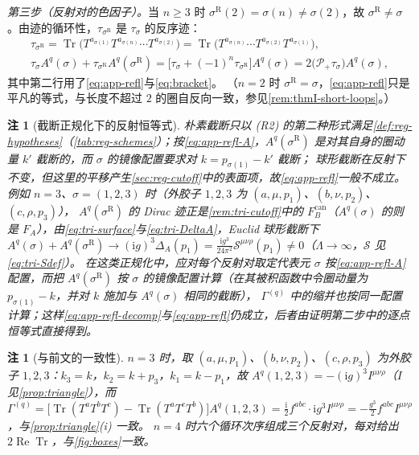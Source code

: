 \documentclass[UTF8,a4paper,11pt,fontset=fandol]{ctexart}
\makeatletter
\theoremstyle{cplain}
\theoremstyle{cdefinition}
\theoremstyle{cremark}
\newtheorem{remark}[theorem]{注}
\renewcommand{\proofname}{证明}
\renewenvironment{proof}[1][\proofname]{\par\pushQED{\qed}\normalfont\topsep6\p@\@plus6\p@\relax
  \trivlist\item[\hskip\labelsep\itshape #1\hspace{0.5em}]\ignorespaces}{\popQED\endtrivlist\@endpefalse}
\numberwithin{equation}{section}
\DeclareMathOperator{\Tr}{Tr}
\DeclareMathOperator{\Real}{Re}
\newcommand{\Pp}{\mathcal{P}_{+}}                    %
\newcommand{\ii}{\mathrm{i}}                        %
\makeatother
\begin{document}
\begin{proof}
\emph{第三步（反射对的色因子）。}当 $n\ge3$ 时 $\sigma^{\mathrm R}(2)=\sigma(n)\neq\sigma(2)$，故 $\sigma^{\mathrm R}\neq\sigma$。由迹的循环性，$\tau_{\sigma^{\mathrm R}}$ 是 $\tau_\sigma$ 的反序迹：
\begin{equation*}
\begin{gathered}
\tau_{\sigma^{\mathrm R}}=\Tr\bigl(T^{a_{\sigma(1)}}T^{a_{\sigma(n)}}\cdots T^{a_{\sigma(2)}}\bigr)=\Tr\bigl(T^{a_{\sigma(n)}}\cdots T^{a_{\sigma(2)}}T^{a_{\sigma(1)}}\bigr),\\
\tau_\sigma A^q(\sigma)+\tau_{\sigma^{\mathrm R}}A^q(\sigma^{\mathrm R})=\bigl[\tau_\sigma+(-1)^n\tau_{\sigma^{\mathrm R}}\bigr]A^q(\sigma)=2\bigl(\Pp\tau_\sigma\bigr)A^q(\sigma),
\end{gathered}
\end{equation*}
其中第二行用了\cref{eq:app-refl}与\cref{eq:bracket}。
（$n=2$ 时 $\sigma^{\mathrm R}=\sigma$，\cref{eq:app-refl}只是平凡的等式，与长度不超过 $2$ 的圈自反向一致，参见\cref{rem:thmI-short-loops}。）
\end{proof}

\begin{remark}[截断正规化下的反射恒等式]\label{rem:app-refl-cutoff}
朴素截断只以 (R2) 的第二种形式满足\cref{def:reg-hypotheses}（\cref{tab:reg-schemes}）；按\cref{eq:app-refl-A}，$A^q(\sigma^{\mathrm R})$ 是对其自身的圈动量 $k'$ 截断的，而 $\sigma$ 的镜像配置要求对 $k=p_{\sigma(1)}-k'$ 截断；
球形截断在反射下不变，但这里的平移产生\cref{sec:reg-cutoff}中的表面项，故\cref{eq:app-refl}一般不成立。例如 $n=3$、$\sigma=(1,2,3)$ 时（外胶子 $1,2,3$ 为 $(a,\mu,p_1)$、$(b,\nu,p_2)$、$(c,\rho,p_3)$），
$A^q(\sigma^{\mathrm R})$ 的 Dirac 迹正是\cref{rem:tri-cutoff}中的 $F_B^{\mathrm{can}}$（$A^q(\sigma)$ 的则是 $F_A$），由\cref{eq:tri-surface}与\cref{eq:tri-DeltaA}，Euclid 球形截断下
$A^q(\sigma)+A^q(\sigma^{\mathrm R})\to(\ii g)^3\Delta_A(p_1)=\frac{\ii g^3}{24\pi^2}\mathcal S^{\mu\nu\rho}(p_1)\neq0$（$\Lambda\to\infty$，$\mathcal S$ 见\cref{eq:tri-Sdef}）。
在这类正规化中，应对每个反射对取定代表元 $\sigma$ 按\cref{eq:app-refl-A}配置，而把 $A^q(\sigma^{\mathrm R})$ 按 $\sigma$ 的镜像配置计算（在其被积函数中令圈动量为 $p_{\sigma(1)}-k$，并对 $k$ 施加与 $A^q(\sigma)$ 相同的截断），
$\Gamma^{(q)}$ 中的缩并也按同一配置计算；这样\cref{eq:app-refl-decomp}与\cref{eq:app-refl}仍成立，后者由证明第二步中的逐点恒等式直接得到。
\end{remark}

\begin{remark}[与前文的一致性]\label{rem:app-refl-consistency}
$n=3$ 时，取 $(a,\mu,p_1)$、$(b,\nu,p_2)$、$(c,\rho,p_3)$ 为外胶子 $1,2,3$：$k_3=k$，$k_2=k+p_3$，$k_1=k-p_1$，故 $A^q(1,2,3)=-(\ii g)^3I^{\mu\nu\rho}$（$I$ 见\cref{prop:triangle}），而
$\Gamma^{(q)}=\bigl[\Tr(T^aT^bT^c)-\Tr(T^aT^cT^b)\bigr]A^q(1,2,3)=\frac{\ii}{2}f^{abc}\cdot\ii g^3I^{\mu\nu\rho}=-\frac{g^3}{2}f^{abc}I^{\mu\nu\rho}$，与\cref{prop:triangle}(i) 一致。
$n=4$ 时六个循环次序组成三个反射对，每对给出 $2\Real\Tr$，与\cref{fig:boxes}一致。
\end{remark}
\end{document}
